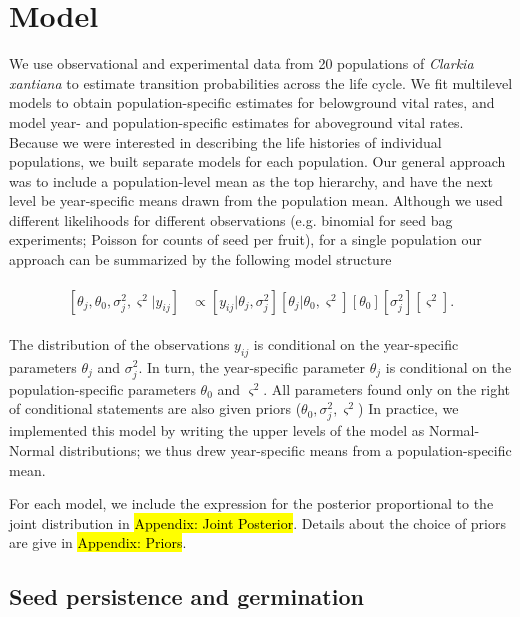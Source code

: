 \documentclass[12pt, oneside, titlepage]{article}   	%
\begin{document}
\section{Model}

We use observational and experimental data from 20 populations of \textit{Clarkia xantiana} to estimate transition probabilities across the life cycle. We fit multilevel models to obtain population-specific estimates for belowground vital rates, and model year- and population-specific estimates for aboveground vital rates. Because we were interested in describing the life histories of individual populations, we built separate models for each population. Our general approach was to include a population-level mean as the top hierarchy, and have the next level be year-specific means drawn from the population mean. Although we used different likelihoods for different observations (e.g. binomial for seed bag experiments; Poisson for counts of seed per fruit), for a single population our approach can be summarized by the following model structure

\begin{align}
  \begin{split}
  [ \theta_j , \theta_0 , \sigma_j^2 , \varsigma^2 | y_{ij} ] &  \propto [ y_{ij} | \theta_j , \sigma^2_j] [ \theta_j | \theta_0 , \varsigma^2 ] [ \theta_0 ] [ \sigma^2_j] [ \varsigma^2].
  \end{split}
\end{align}

The distribution of the observations $y_{ij}$ is conditional on the year-specific parameters $\theta_j$ and $\sigma^2_j$. In turn, the year-specific parameter $\theta_j$ is conditional on the population-specific parameters $\theta_0$ and $ \varsigma^2$. All parameters found only on the right of conditional statements are also given priors ($\theta_0, \sigma^2_j, \varsigma^2$) In practice, we implemented this model by writing the upper levels of the model as Normal-Normal distributions; we thus drew year-specific means from a population-specific mean.

For each model, we include the expression for the posterior proportional to the joint distribution in \hl{Appendix: Joint Posterior}. Details about the choice of priors are give in \hl{Appendix: Priors}.

\subsection{Seed persistence and germination}
\end{document}
